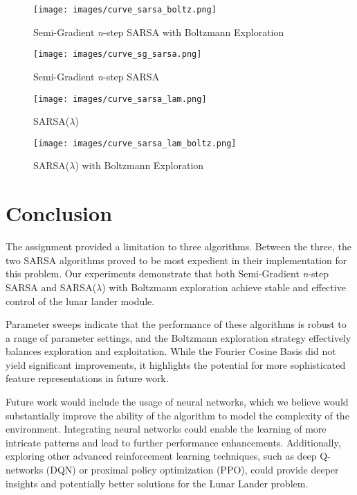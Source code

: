 \documentclass[journal]{IEEEtran}
\begin{document}
\begin{figure}[H]
  \texttt{[image: images/curve\_sarsa\_boltz.png]}
  \caption{Semi-Gradient \emph{n}-step SARSA with Boltzmann Exploration} 
  \label{fig:curve_sgsarsa}
\end{figure}
\begin{figure}[H]
  \texttt{[image: images/curve\_sg\_sarsa.png]}
  \caption{Semi-Gradient \emph{n}-step SARSA} 
  \label{fig:curve_sgsarsa_boltz}
\end{figure}
\begin{figure}[H]
  \texttt{[image: images/curve\_sarsa\_lam.png]}
  \caption{SARSA(\(\lambda\))} 
  \label{fig:curve_sarsalam}
\end{figure}
\begin{figure}[H]
  \texttt{[image: images/curve\_sarsa\_lam\_boltz.png]}
  \caption{SARSA(\(\lambda\)) with Boltzmann Exploration} 
  \label{fig:curve_sarsalam_boltz}
\end{figure}

\section{Conclusion}
\label{sec:conclusion}
The assignment provided a limitation to three algorithms. Between the three, the two SARSA 
algorithms proved to be most expedient in their implementation for this problem. 
Our experiments demonstrate that both Semi-Gradient \emph{n}-step SARSA and SARSA($\lambda$) with 
Boltzmann exploration achieve stable and effective control of the lunar lander module. 

Parameter sweeps indicate that the performance of these algorithms is robust to a range of 
parameter settings, and the Boltzmann exploration strategy effectively balances exploration and 
exploitation. While the Fourier Cosine Basis did not yield significant improvements, 
it highlights the potential for more sophisticated feature representations in future work.

Future work would include the usage of neural networks, which we believe would substantially 
improve the ability of the algorithm to model the complexity of the environment. 
Integrating neural networks could enable the learning of more intricate patterns 
and lead to further performance enhancements. Additionally, exploring other advanced 
reinforcement learning techniques, such as deep Q-networks (DQN) or 
proximal policy optimization (PPO), could provide deeper insights and potentially better 
solutions for the Lunar Lander problem.

\label{sec:references}
\printbibliography
\end{document}
